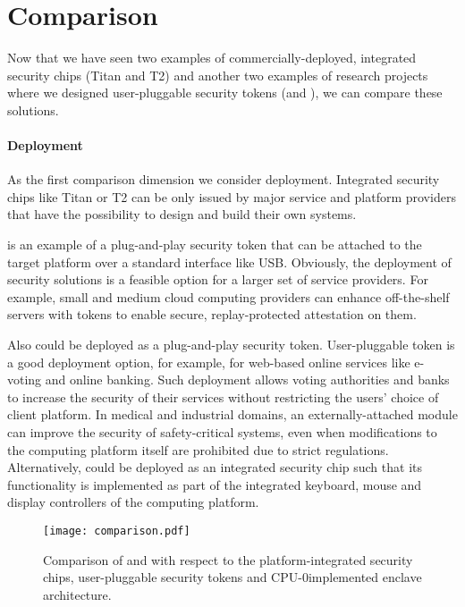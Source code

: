 
\section*{Comparison}

Now that we have seen two examples of commercially-deployed, integrated security chips (Titan and T2) and another two examples of research projects where we designed user-pluggable security tokens (\protection and \proximitee), we can compare these solutions. 

\paragraph{Deployment}
As the first comparison dimension we consider deployment. Integrated security chips like Titan or T2 can be only issued by major service and platform providers that have the possibility to design and build their own systems. 

\proximitee is an example of a plug-and-play security token that can be attached to the target platform over a standard interface like USB. Obviously, the deployment of security solutions is a feasible option for a larger set of service providers. For example, small and medium cloud computing providers can enhance off-the-shelf servers with \proximitee tokens to enable secure, replay-protected attestation on them. 

Also \protection could be deployed as a plug-and-play security token. User-pluggable token is a good deployment option, for example, for web-based online services like e-voting and online banking. Such deployment allows voting authorities and banks to increase the security of their services without restricting the users’ choice of client platform. In medical and industrial domains, an externally-attached \protection module can improve the security of safety-critical systems, even when modifications to the computing platform itself are prohibited due to strict regulations. Alternatively, \protection could be deployed as an integrated security chip such that its functionality is implemented as part of the integrated keyboard, mouse and display controllers of the computing platform. 

\begin{figure}[t]
	\centering
	\texttt{[image: comparison.pdf]}
	\caption{Comparison of \protection and \proximitee with respect to the platform-integrated security chips, user-pluggable security tokens and CPU-0implemented enclave architecture.}
\label{fig:prototype}   
\end{figure}


